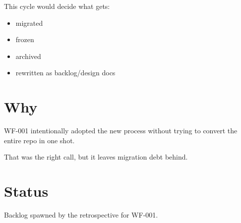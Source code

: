 This cycle would decide what gets:

\begin{itemize}
\tightlist
\item
  migrated
\item
  frozen
\item
  archived
\item
  rewritten as backlog/design docs
\end{itemize}

\section{Why}\label{record-408-why}

WF-001 intentionally adopted the new process without trying to convert the entire repo in one shot.

That was the right call, but it leaves migration debt behind.

\section{Status}\label{record-408-status}

Backlog spawned by the retrospective for WF-001.

